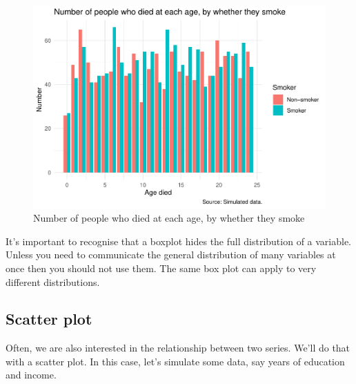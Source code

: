 \documentclass[
]{book}
\begin{document}
\begin{figure}
\centering
\includegraphics{telling_stories_with_data_files/figure-latex/mysthidgraph-1.pdf}
\caption{\label{fig:mysthidgraph}Number of people who died at each age, by whether they smoke}
\end{figure}

It's important to recognise that a boxplot hides the full distribution of a variable. Unless you need to communicate the general distribution of many variables at once then you should not use them. The same box plot can apply to very different distributions.

\hypertarget{scatter-plot}{%
\subsection{Scatter plot}\label{scatter-plot}}

Often, we are also interested in the relationship between two series. We'll do that with a scatter plot. In this case, let's simulate some data, say years of education and income.
\end{document}
